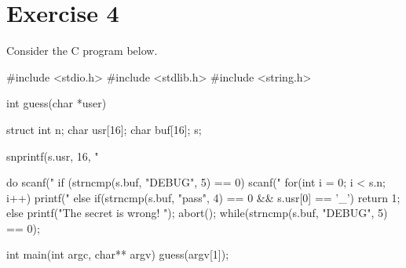 \section{Exercise 4}

Consider the C program below.
\begin{verbnobox}[\verbarg]
#include <stdio.h>
#include <stdlib.h>
#include <string.h>

int guess(char *user) {
    struct {
        int n;
        char usr[16];
        char buf[16];
    } s;

    snprintf(s.usr, 16, "%

    do {
        scanf("%
        if (strncmp(s.buf, "DEBUG", 5) == 0) {
            scanf("%
            for(int i = 0; i < s.n; i++) {
                printf("%
            }
        } else {
            if(strncmp(s.buf, "pass", 4) == 0 && s.usr[0] == '_') {
                return 1;
            } else {
                printf("The secret is wrong! \n");
                abort();
                }
        }
    } while(strncmp(s.buf, "DEBUG", 5) == 0);
}

int main(int argc, char** argv) {
    guess(argv[1]);
}
\end{verbnobox}


